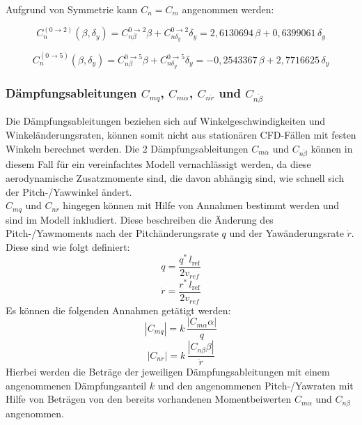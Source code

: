 Aufgrund von Symmetrie kann $C_n = C_m$ angenommen werden:

\begin{equation}
C_n^{(0\to2)}(\beta,\delta_y)
= C_{n\beta}^{0\to2}\beta + C_{n\delta_y}^{0\to2}\delta_y
= 2{,}6130694\,\beta + 0{,}6399061\,\delta_y
\end{equation}

\begin{equation}
C_n^{(0\to5)}(\beta,\delta_y)
= C_{n\beta}^{0\to5}\beta + C_{n\delta_y}^{0\to5}\delta_y
= -0{,}2543367\,\beta + 2{,}7716625\,\delta_y
\end{equation}
\newpage

\subsubsection*{Dämpfungsableitungen $C_{mq}$, $C_{m\dot{\alpha}}$, $C_{n\dot{r}}$ und $C_{n\dot{\beta}}$}
\label{subsubsec:damping_derivatives_calculation}
Die Dämpfungsableitungen beziehen sich auf Winkelgeschwindigkeiten und Winkeländerungsraten, können somit nicht aus stationären CFD-Fällen mit festen Winkeln berechnet werden. Die 2 Dämpfungsableitungen $C_{m\dot{\alpha}}$ und $C_{n\dot{\beta}}$ können in diesem Fall für ein vereinfachtes Modell vernachlässigt werden, da diese aerodynamische Zusatzmomente sind, die davon abhängig sind, wie schnell sich der Pitch-/Yawwinkel ändert. 
\\
$C_{mq}$ und $C_{n\dot{r}}$ hingegen können mit Hilfe von Annahmen bestimmt werden und sind im Modell inkludiert. Diese beschreiben die Änderung des Pitch-/Yawmoments nach der Pitchänderungsrate $q$ und der Yawänderungsrate $\dot{r}$. Diese sind wie folgt definiert:
\begin{equation}
    q = \frac{q^\ast\,l_\mathrm{ref}}{2v_{ref}}
\end{equation}
\begin{equation}
    \dot{r} = \frac{r^\ast\,l_\mathrm{ref}}{2v_{ref}}
\end{equation}
Es können die folgenden Annahmen getätigt werden:
\begin{equation}
    \left|C_{mq}\right|
    =
    k\,
    \frac{\left|C_{m\alpha}\alpha\right|}{q}
\end{equation}
\begin{equation}
    \left|C_{n\dot{r}}\right|
    =
    k\,
    \frac{\left|C_{n\beta}\beta\right|}{\dot{r}}
\end{equation}
Hierbei werden die Beträge der jeweiligen Dämpfungsableitungen mit einem angenommenen Dämpfungsanteil $k$ und den angenommenen Pitch-/Yawraten mit Hilfe von Beträgen von den bereits vorhandenen Momentbeiwerten $C_{m\alpha}$ und $C_{n\beta}$ angenommen.

